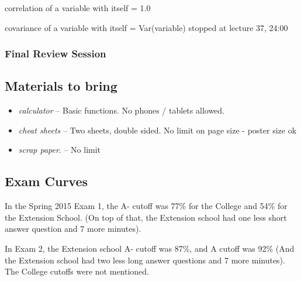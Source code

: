 \documentclass[11pt, oneside]{article}   	%
\begin{document}
correlation of a variable with itself = 1.0

covariance of a variable with itself = Var(variable)
stopped at lecture 37, 24:00

\subsubsection{Final Review Session}



\subsection{Materials to bring}
\begin{itemize}
	\item \emph{calculator} -- Basic functions. No phones / tablets allowed.
	\item \emph{cheat sheets} -- Two sheets, double sided. No limit on page size - poster size ok
	\item \emph{scrap paper}. -- No limit
\end{itemize}

\subsection{Exam Curves}
In the Spring 2015 Exam 1, the A- cutoff was 77\% for the College and 54\% for the Extension School. (On top of that, the Extension school had one less short answer question and 7 more minutes).

In Exam 2, the Extension school A- cutoff was 87\%, and A cutoff was 92\% (And the Extension school had two less long answer questions and 7 more minutes). The College cutoffs were not mentioned.
\end{document}
